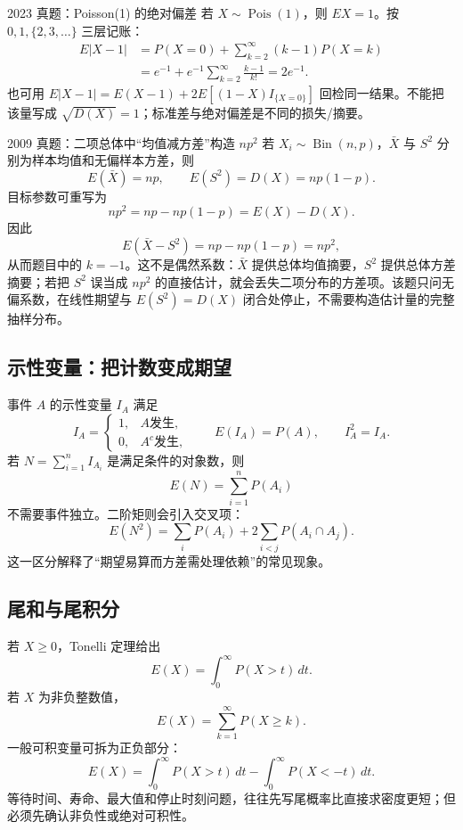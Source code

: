 \documentclass[11pt,a4paper]{ctexart}
\begin{document}
\begin{examplebox}{2023 真题：Poisson(1) 的绝对偏差}
若 $X\sim\operatorname{Pois}(1)$，则 $EX=1$。按 $0,1,\{2,3,\ldots\}$ 三层记账：
\[
\begin{aligned}
E\lvert X-1\rvert
&=P(X=0)+\sum_{k=2}^{\infty}(k-1)P(X=k)\\
&=e^{-1}+e^{-1}\sum_{k=2}^{\infty}\frac{k-1}{k!}
=2e^{-1}.
\end{aligned}
\]
也可用 $E\lvert X-1\rvert=E(X-1)+2E[(1-X)I_{\{X=0\}}]$ 回检同一结果。不能把该量写成 $\sqrt{D(X)}=1$；标准差与绝对偏差是不同的损失/摘要。
\end{examplebox}

\begin{examplebox}{2009 真题：二项总体中“均值减方差”构造 $np^2$}
若 $X_i\sim\operatorname{Bin}(n,p)$，$\bar X$ 与 $S^2$ 分别为样本均值和无偏样本方差，则
\[
E(\bar X)=np,\qquad E(S^2)=D(X)=np(1-p).
\]
目标参数可重写为
\[
np^2=np-np(1-p)=E(X)-D(X).
\]
因此
\[
E(\bar X-S^2)=np-np(1-p)=np^2,
\]
从而题目中的 $k=-1$。这不是偶然系数：$\bar X$ 提供总体均值摘要，$S^2$ 提供总体方差摘要；若把 $S^2$ 误当成 $np^2$ 的直接估计，就会丢失二项分布的方差项。该题只问无偏系数，在线性期望与 $E(S^2)=D(X)$ 闭合处停止，不需要构造估计量的完整抽样分布。
\end{examplebox}

\subsection{示性变量：把计数变成期望}

事件 $A$ 的示性变量 $I_A$ 满足
\[
I_A=\begin{cases}1,&A\text{发生},\\0,&A^c\text{发生},\end{cases}\qquad E(I_A)=P(A),\qquad I_A^2=I_A.
\]
若 $N=\sum_{i=1}^nI_{A_i}$ 是满足条件的对象数，则
\[
E(N)=\sum_{i=1}^nP(A_i)
\]
不需要事件独立。二阶矩则会引入交叉项：
\[
E(N^2)=\sum_iP(A_i)+2\sum_{i<j}P(A_i\cap A_j).
\]
这一区分解释了“期望易算而方差需处理依赖”的常见现象。

\subsection{尾和与尾积分}

若 $X\geq0$，Tonelli 定理给出
\[
\boxed{E(X)=\int_0^{\infty}P(X>t)\,dt}.
\]
若 $X$ 为非负整数值，
\[
\boxed{E(X)=\sum_{k=1}^{\infty}P(X\geq k)}.
\]
一般可积变量可拆为正负部分：
\[
E(X)=\int_0^\infty P(X>t)\,dt-\int_0^\infty P(X<-t)\,dt.
\]
等待时间、寿命、最大值和停止时刻问题，往往先写尾概率比直接求密度更短；但必须先确认非负性或绝对可积性。
\end{document}
